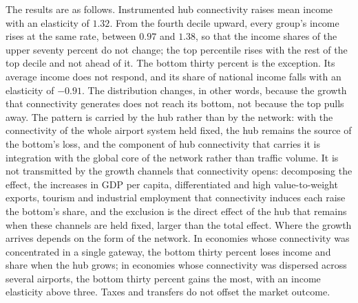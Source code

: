 The results are as follows. Instrumented hub connectivity raises mean income with an elasticity of $1.32$. From the fourth decile upward, every group's income rises at the same rate, between $0.97$ and $1.38$, so that the income shares of the upper seventy percent do not change; the top percentile rises with the rest of the top decile and not ahead of it. The bottom thirty percent is the exception. Its average income does not respond, and its share of national income falls with an elasticity of $-0.91$. The distribution changes, in other words, because the growth that connectivity generates does not reach its bottom, not because the top pulls away. The pattern is carried by the hub rather than by the network: with the connectivity of the whole airport system held fixed, the hub remains the source of the bottom's loss, and the component of hub connectivity that carries it is integration with the global core of the network rather than traffic volume. It is not transmitted by the growth channels that connectivity opens: decomposing the effect, the increases in GDP per capita, differentiated and high value-to-weight exports, tourism and industrial employment that connectivity induces each raise the bottom's share, and the exclusion is the direct effect of the hub that remains when these channels are held fixed, larger than the total effect. Where the growth arrives depends on the form of the network. In economies whose connectivity was concentrated in a single gateway, the bottom thirty percent loses income and share when the hub grows; in economies whose connectivity was dispersed across several airports, the bottom thirty percent gains the most, with an income elasticity above three. Taxes and transfers do not offset the market outcome.

